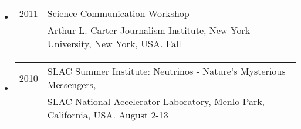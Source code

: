\begin{itemize}
\item \begin{tabular}{ll}
2011 & Science Communication Workshop\\
	& Arthur L. Carter Journalism Institute, New York University, New York, USA.  Fall \\
\end{tabular}

\item \begin{tabular}{ll}
2010 & SLAC Summer Institute: Neutrinos - Nature's Mysterious Messengers, \\ 
	 & SLAC National Accelerator Laboratory, Menlo Park, California, USA.  August 2-13\\
\end{tabular}
\end{itemize}




